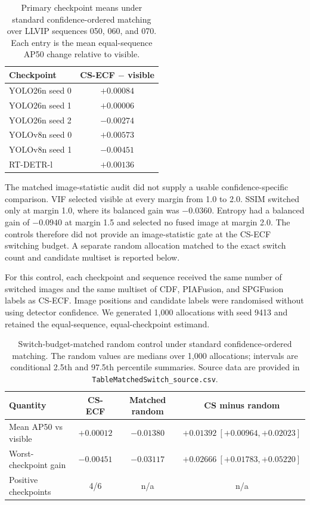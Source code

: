 \documentclass[11pt]{article}
\begin{document}
\begin{table}[ht]
\centering
\small
\caption{Primary checkpoint means under standard confidence-ordered matching
over LLVIP sequences 050, 060, and 070. Each entry is the mean equal-sequence
AP50 change relative to visible.}
\label{tab:prospective-checkpoints}
\begin{tabular}{@{}lc@{}}
\toprule
Checkpoint & CS-ECF \(-\) visible \\
\midrule
YOLO26n seed 0 & \(+0.00084\) \\
YOLO26n seed 1 & \(+0.00006\) \\
YOLO26n seed 2 & \(-0.00274\) \\
YOLOv8n seed 0 & \(+0.00573\) \\
YOLOv8n seed 1 & \(-0.00451\) \\
RT-DETR-l & \(+0.00136\) \\
\bottomrule
\end{tabular}
\end{table}

The matched image-statistic audit did not supply a usable confidence-specific
comparison. VIF selected visible at every margin from 1.0 to 2.0. SSIM switched
only at margin 1.0, where its balanced gain was \(-0.0360\). Entropy had a
balanced gain of \(-0.0940\) at margin 1.5 and selected no fused image at margin
2.0. The controls therefore did not provide an image-statistic gate at the
CS-ECF switching budget. A separate random allocation matched to the exact
switch count and candidate multiset is reported below.

For this control, each checkpoint and sequence received the same number of
switched images and the same multiset of CDF, PIAFusion, and SPGFusion labels
as CS-ECF. Image positions and candidate labels were randomised without using
detector confidence. We generated 1,000 allocations with seed 9413 and retained
the equal-sequence, equal-checkpoint estimand.

\begin{table}[ht]
\centering
\small
\caption{Switch-budget-matched random control under standard
confidence-ordered matching. The random values are medians over 1,000
allocations; intervals are conditional 2.5th and 97.5th percentile summaries.
Source data are provided in \texttt{TableMatchedSwitch\_source.csv}.}
\label{tab:matched-switch}
\begin{tabular}{@{}lccc@{}}
\toprule
Quantity & CS-ECF & Matched random & CS minus random \\
\midrule
Mean AP50 vs visible & \(+0.00012\) & \(-0.01380\) &
\(+0.01392~[+0.00964,+0.02023]\) \\
Worst-checkpoint gain & \(-0.00451\) & \(-0.03117\) &
\(+0.02666~[+0.01783,+0.05220]\) \\
Positive checkpoints & 4/6 & n/a & n/a \\
\bottomrule
\end{tabular}
\end{table}
\end{document}
